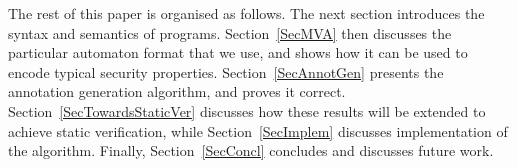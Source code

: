 The rest of this paper is organised as follows. The next section
introduces the syntax and semantics of programs. Section~\ref{SecMVA}
then discusses the particular automaton format that we use, and shows
how it can be used to encode typical security
properties. Section~\ref{SecAnnotGen} presents the annotation
generation algorithm, and proves it
correct. Section~\ref{SecTowardsStaticVer} discusses how these results
will be extended to achieve static verification, while
Section~\ref{SecImplem} discusses implementation of the
algorithm. Finally, Section~\ref{SecConcl} concludes and discusses
future work.

